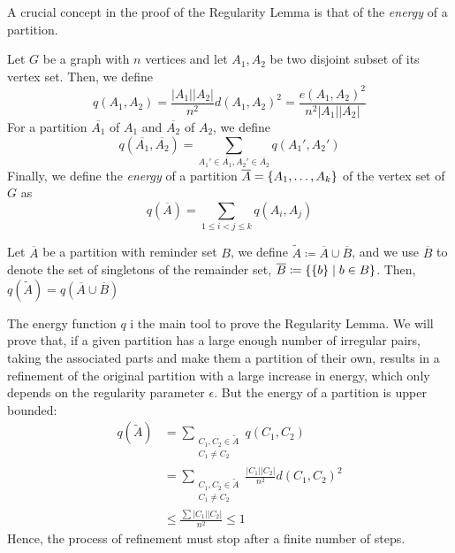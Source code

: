         A crucial concept in the proof of the Regularity Lemma is that of the \emph{energy} of a partition.

        \begin{definition}
            Let $G$ be a graph with $n$ vertices and let $A_1, A_2$ be two disjoint subset of its vertex set.
            Then, we define
            \[
                q(A_1, A_2) = \frac{|A_1||A_2|}{n^2} d(A_1, A_2)^2 = \frac{e(A_1, A_2)^2}{n^2 |A_1| |A_2|}
            \]
            For a partition $\overline{A_1}$ of $A_1$ and $\overline{A_2}$ of $A_2$, we define
            \[
                q(\overline{A_1}, \overline{A_2}) = \sum_{A_1' \in \overline{A_1}, A_2' \in \overline{A_2}} q(A_1', A_2')
            \]
            Finally, we define the \emph{energy} of a partition $\overline{A} = \{ A_1, \dots, A_k \}$ of the
            vertex set of $G$ as
            \[
                q(\overline{A}) = \sum_{1 \leq i < j \leq k} q(A_i, A_j)
            \]
        \end{definition}

        Let $\overline{A}$ be a partition with reminder set $B$, we define
        $\widetilde{A} \coloneqq \overline{A} \cup \overline{B}$, and we use $\overline{B}$ to denote the set
        of singletons of the remainder set, $\overline{B} \coloneqq \{ \{ b \} \mid b \in B \}$.
        Then, $q(\widetilde{A}) = q(\overline{A} \cup \overline{B})$

        The energy function $q$ i the main tool to prove the Regularity Lemma.
        We will prove that, if a given partition has a large enough number of irregular pairs, taking the
        associated parts and make them a partition of their own, results in a refinement of the original partition
        with a large increase in energy, which only depends on the regularity parameter $\epsilon$.
        But the energy of a partition is upper bounded:
        \begin{align*}
            q(\widetilde{A}) &= \sum_{\substack{C_1, C_2 \in \widetilde{A} \\ C_1 \neq C_2}} q(C_1, C_2) \\
                &= \sum_{\substack{C_1, C_2 \in \widetilde{A} \\ C_1 \neq C_2}} \frac{|C_1||C_2|}{n^2} d(C_1, C_2)^2 \\
                &\leq \frac{\sum |C_1||C_2|}{n^2} \leq 1
        \end{align*}
        Hence, the process of refinement must stop after a finite number of steps.

